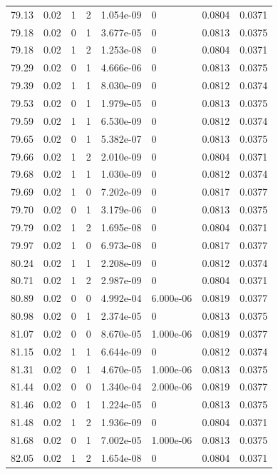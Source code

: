 \documentclass[preview]{standalone}
\begin{document}
{{{{{{{{{{{{\begin{tabular}{L{1.2cm}C{1.2cm} C{0.3cm}C{0.5cm} C{1.4cm}C{1.4cm} C{1.4cm}C{1.4cm}}
  79.13  &  0.02  & 1     &  2 &  1.054e-09  & 0  & 0.0804 &  0.0371   \\ 
  79.18  &  0.02  & 0     &  1 &  3.677e-05  & 0  & 0.0813 &  0.0375   \\ 
  79.18  &  0.02  & 1     &  2 &  1.253e-08  & 0  & 0.0804 &  0.0371   \\ 
  79.29  &  0.02  & 0     &  1 &  4.666e-06  & 0  & 0.0813 &  0.0375   \\ 
  79.39  &  0.02  & 1     &  1 &  8.030e-09  & 0  & 0.0812 &  0.0374   \\ 
  79.53  &  0.02  & 0     &  1 &  1.979e-05  & 0  & 0.0813 &  0.0375   \\ 
  79.59  &  0.02  & 1     &  1 &  6.530e-09  & 0  & 0.0812 &  0.0374   \\ 
  79.65  &  0.02  & 0     &  1 &  5.382e-07  & 0  & 0.0813 &  0.0375   \\ 
  79.66  &  0.02  & 1     &  2 &  2.010e-09  & 0  & 0.0804 &  0.0371   \\ 
  79.68  &  0.02  & 1     &  1 &  1.030e-09  & 0  & 0.0812 &  0.0374   \\ 
  79.69  &  0.02  & 1     &  0 &  7.202e-09  & 0  & 0.0817 &  0.0377   \\ 
  79.70  &  0.02  & 0     &  1 &  3.179e-06  & 0  & 0.0813 &  0.0375   \\ 
  79.79  &  0.02  & 1     &  2 &  1.695e-08  & 0  & 0.0804 &  0.0371   \\ 
  79.97  &  0.02  & 1     &  0 &  6.973e-08  & 0  & 0.0817 &  0.0377   \\ 
  80.24  &  0.02  & 1     &  1 &  2.208e-09  & 0  & 0.0812 &  0.0374   \\ 
  80.71  &  0.02  & 1     &  2 &  2.987e-09  & 0  & 0.0804 &  0.0371   \\ 
  80.89  &  0.02  & 0     &  0 &  4.992e-04  & 6.000e-06  & 0.0819 &  0.0377   \\ 
  80.98  &  0.02  & 0     &  1 &  2.374e-05  & 0  & 0.0813 &  0.0375   \\ 
  81.07  &  0.02  & 0     &  0 &  8.670e-05  & 1.000e-06  & 0.0819 &  0.0377   \\ 
  81.15  &  0.02  & 1     &  1 &  6.644e-09  & 0  & 0.0812 &  0.0374   \\ 
  81.31  &  0.02  & 0     &  1 &  4.670e-05  & 1.000e-06  & 0.0813 &  0.0375   \\ 
  81.44  &  0.02  & 0     &  0 &  1.340e-04  & 2.000e-06  & 0.0819 &  0.0377   \\ 
  81.46  &  0.02  & 0     &  1 &  1.224e-05  & 0  & 0.0813 &  0.0375   \\ 
  81.48  &  0.02  & 1     &  2 &  1.936e-09  & 0  & 0.0804 &  0.0371   \\ 
  81.68  &  0.02  & 0     &  1 &  7.002e-05  & 1.000e-06  & 0.0813 &  0.0375   \\ 
  82.05  &  0.02  & 1     &  2 &  1.654e-08  & 0  & 0.0804 &  0.0371   \\ 
\hline 
\end{tabular} 

}}}}}}}}}}}}
\end{document}

